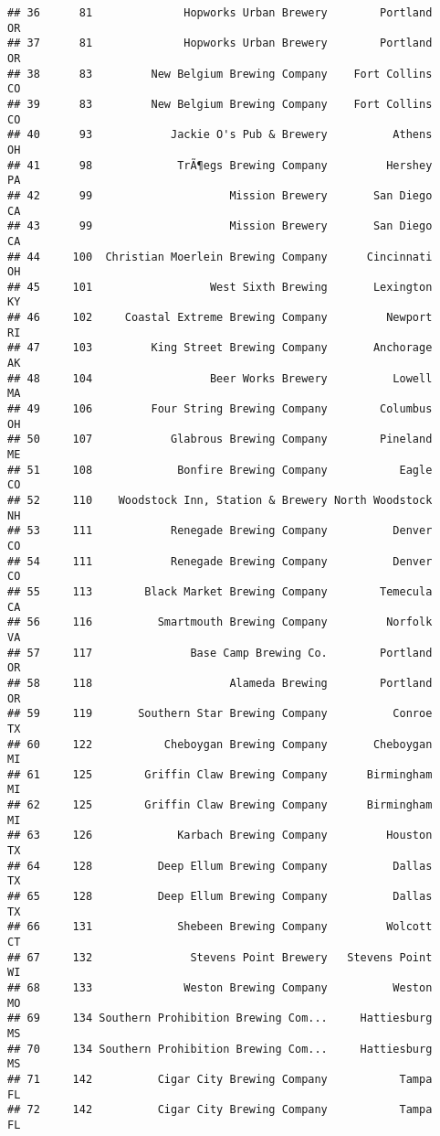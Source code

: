 \documentclass[
]{article}
\begin{document}
\begin{verbatim}
## 36      81              Hopworks Urban Brewery        Portland    OR
## 37      81              Hopworks Urban Brewery        Portland    OR
## 38      83         New Belgium Brewing Company    Fort Collins    CO
## 39      83         New Belgium Brewing Company    Fort Collins    CO
## 40      93            Jackie O's Pub & Brewery          Athens    OH
## 41      98             TrÃ¶egs Brewing Company         Hershey    PA
## 42      99                     Mission Brewery       San Diego    CA
## 43      99                     Mission Brewery       San Diego    CA
## 44     100  Christian Moerlein Brewing Company      Cincinnati    OH
## 45     101                  West Sixth Brewing       Lexington    KY
## 46     102     Coastal Extreme Brewing Company         Newport    RI
## 47     103         King Street Brewing Company       Anchorage    AK
## 48     104                  Beer Works Brewery          Lowell    MA
## 49     106         Four String Brewing Company        Columbus    OH
## 50     107            Glabrous Brewing Company        Pineland    ME
## 51     108             Bonfire Brewing Company           Eagle    CO
## 52     110    Woodstock Inn, Station & Brewery North Woodstock    NH
## 53     111            Renegade Brewing Company          Denver    CO
## 54     111            Renegade Brewing Company          Denver    CO
## 55     113        Black Market Brewing Company        Temecula    CA
## 56     116          Smartmouth Brewing Company         Norfolk    VA
## 57     117               Base Camp Brewing Co.        Portland    OR
## 58     118                     Alameda Brewing        Portland    OR
## 59     119       Southern Star Brewing Company          Conroe    TX
## 60     122           Cheboygan Brewing Company       Cheboygan    MI
## 61     125        Griffin Claw Brewing Company      Birmingham    MI
## 62     125        Griffin Claw Brewing Company      Birmingham    MI
## 63     126             Karbach Brewing Company         Houston    TX
## 64     128          Deep Ellum Brewing Company          Dallas    TX
## 65     128          Deep Ellum Brewing Company          Dallas    TX
## 66     131             Shebeen Brewing Company         Wolcott    CT
## 67     132               Stevens Point Brewery   Stevens Point    WI
## 68     133              Weston Brewing Company          Weston    MO
## 69     134 Southern Prohibition Brewing Com...     Hattiesburg    MS
## 70     134 Southern Prohibition Brewing Com...     Hattiesburg    MS
## 71     142          Cigar City Brewing Company           Tampa    FL
## 72     142          Cigar City Brewing Company           Tampa    FL

\end{verbatim}
\end{document}
